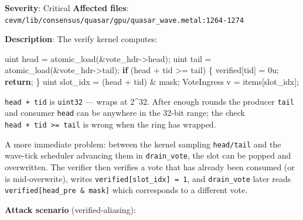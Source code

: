 \documentclass[
]{article}
\newenvironment{Shaded}{}{}
\newcommand{\BuiltInTok}[1]{\textcolor[rgb]{0.00,0.50,0.00}{#1}}
\newcommand{\ControlFlowTok}[1]{\textcolor[rgb]{0.00,0.44,0.13}{\textbf{#1}}}
\newcommand{\DecValTok}[1]{\textcolor[rgb]{0.25,0.63,0.44}{#1}}
\newcommand{\NormalTok}[1]{#1}
\newcommand{\OperatorTok}[1]{\textcolor[rgb]{0.40,0.40,0.40}{#1}}
\begin{document}
\textbf{Severity}: Critical \textbf{Affected files}:
\texttt{cevm/lib/consensus/quasar/gpu/quasar\_wave.metal:1264-1274}

\textbf{Description}: The verify kernel computes:

\begin{Shaded}
\begin{Highlighting}[]
\NormalTok{uint head }\OperatorTok{=}\NormalTok{ atomic\_load}\OperatorTok{(\&}\NormalTok{vote\_hdr}\OperatorTok{{-}\textgreater{}}\NormalTok{head}\OperatorTok{);}
\NormalTok{uint tail }\OperatorTok{=}\NormalTok{ atomic\_load}\OperatorTok{(\&}\NormalTok{vote\_hdr}\OperatorTok{{-}\textgreater{}}\NormalTok{tail}\OperatorTok{);}
\ControlFlowTok{if} \OperatorTok{(}\NormalTok{head }\OperatorTok{+}\NormalTok{ tid }\OperatorTok{\textgreater{}=}\NormalTok{ tail}\OperatorTok{)} \OperatorTok{\{}\NormalTok{ verified}\OperatorTok{[}\NormalTok{tid}\OperatorTok{]} \OperatorTok{=} \DecValTok{0}\BuiltInTok{u}\OperatorTok{;} \ControlFlowTok{return}\OperatorTok{;} \OperatorTok{\}}
\NormalTok{uint slot\_idx }\OperatorTok{=} \OperatorTok{(}\NormalTok{head }\OperatorTok{+}\NormalTok{ tid}\OperatorTok{)} \OperatorTok{\&}\NormalTok{ mask}\OperatorTok{;}
\NormalTok{VoteIngress v }\OperatorTok{=}\NormalTok{ items}\OperatorTok{[}\NormalTok{slot\_idx}\OperatorTok{];}
\end{Highlighting}
\end{Shaded}

\texttt{head\ +\ tid} is \texttt{uint32} --- wraps at 2\^{}32. After
enough rounds the producer \texttt{tail} and consumer \texttt{head} can
be anywhere in the 32-bit range; the check
\texttt{head\ +\ tid\ \textgreater{}=\ tail} is wrong when the ring has
wrapped.

A more immediate problem: between the kernel sampling \texttt{head/tail}
and the wave-tick scheduler advancing them in \texttt{drain\_vote}, the
slot can be popped and overwritten. The verifier then verifies a vote
that has already been consumed (or is mid-overwrite), writes
\texttt{verified{[}slot\_idx{]}\ =\ 1}, and \texttt{drain\_vote} later
reads \texttt{verified{[}head\_pre\ \&\ mask{]}} which corresponds to a
different vote.

\textbf{Attack scenario} (verified-aliasing):
\end{document}
